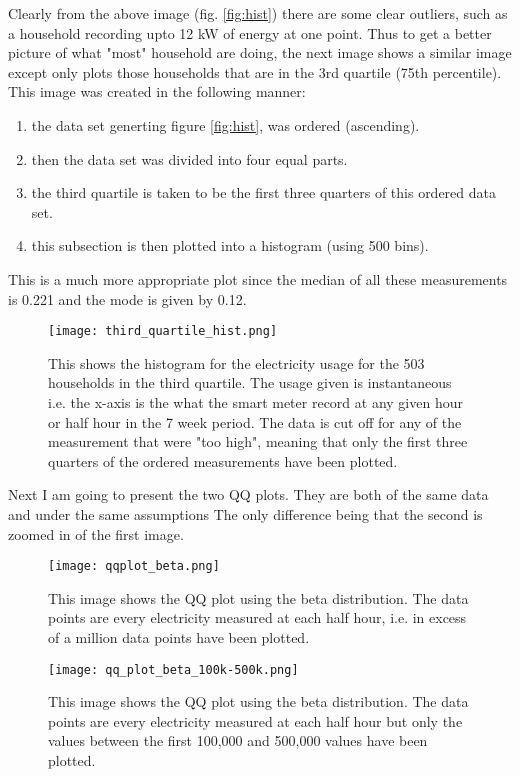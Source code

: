 \documentclass[a4paper]{article}
\begin{document}
Clearly from the above image (fig. \ref{fig:hist}) there are some clear outliers, such as a household recording upto 12 kW of energy at one point. Thus to get a better picture of what "most" household are doing, the next image shows a similar image except only plots those households that are in the 3rd quartile (75th percentile). This image was created in the following manner:
\begin{enumerate}
\item the data set generting figure \ref{fig:hist}, was ordered (ascending).
\item then the data set was divided into four equal parts.
\item the third quartile is taken to be the first three quarters of this ordered data set.
\item this subsection is then plotted into a histogram (using 500 bins).
\end{enumerate}
This is a much more appropriate plot since the median of all these measurements is 0.221 and the mode is given by 0.12.

\begin{figure}
\centering
\texttt{[image: third\_quartile\_hist.png]}
\caption{\label{fig:3quart} This shows the histogram for the electricity usage for the 503 households in the third quartile. The usage given is instantaneous i.e. the x-axis is the what the smart meter record at any given hour or half hour in the 7 week period. The data is cut off for any of the measurement that were "too high", meaning that only the first three quarters of the ordered measurements have been plotted.}
\end{figure}

Next I am going to present the two QQ plots. They are both of the same data and under the same assumptions The only difference being that the second is zoomed in of the first image.

\begin{figure}
\centering
\texttt{[image: qqplot\_beta.png]}
\caption{\label{fig:beta} This image shows the QQ plot using the beta distribution. The data points are every electricity measured at each half hour, i.e. in excess of a million data points have been plotted.}
\end{figure}


\begin{figure}
\centering
\texttt{[image: qq\_plot\_beta\_100k-500k.png]}
\caption{\label{fig:beta_sub} This image shows the QQ plot using the beta distribution. The data points are every electricity measured at each half hour but only the values between the first 100,000 and 500,000 values have been plotted.}
\end{figure}
\end{document}

